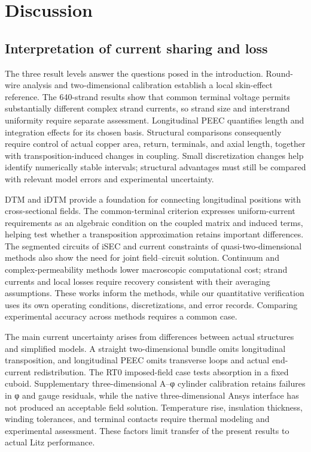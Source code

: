\section{Discussion}
\label{chapter:04}

\hypertarget{04.discussion.heading}{}
\subsection{Interpretation of current sharing and loss}

\hypertarget{04.discussion.p1}{}
The three result levels answer the questions posed in the introduction. Round-wire analysis and two-dimensional calibration establish a local skin-effect reference. The 640-strand results show that common terminal voltage permits substantially different complex strand currents, so strand size and interstrand uniformity require separate assessment. Longitudinal PEEC quantifies length and integration effects for its chosen basis. Structural comparisons consequently require control of actual copper area, return, terminals, and axial length, together with transposition-induced changes in coupling. Small discretization changes help identify numerically stable intervals; structural advantages must still be compared with relevant model errors and experimental uncertainty.

\hypertarget{04.discussion.p2}{}
DTM and iDTM \cite{P01,N01} provide a foundation for connecting longitudinal positions with cross-sectional fields. The common-terminal criterion expresses uniform-current requirements as an algebraic condition on the coupled matrix and induced terms, helping test whether a transposition approximation retains important differences. The segmented circuits of iSEC \cite{P02} and current constraints of quasi-two-dimensional methods \cite{P04} also show the need for joint field–circuit solution. Continuum and complex-permeability methods \cite{P05,P09} lower macroscopic computational cost; strand currents and local losses require recovery consistent with their averaging assumptions. These works inform the methods, while our quantitative verification uses its own operating conditions, discretizations, and error records. Comparing experimental accuracy across methods requires a common case.

\hypertarget{04.discussion.p3}{}
The main current uncertainty arises from differences between actual structures and simplified models. A straight two-dimensional bundle omits longitudinal transposition, and longitudinal PEEC omits transverse loops and actual end-current redistribution. The RT0 imposed-field case tests absorption in a fixed cuboid. Supplementary three-dimensional A–φ cylinder calibration retains failures in φ and gauge residuals, while the native three-dimensional Ansys interface has not produced an acceptable field solution. Temperature rise, insulation thickness, winding tolerances, and terminal contacts require thermal modeling and experimental assessment. These factors limit transfer of the present results to actual Litz performance.

